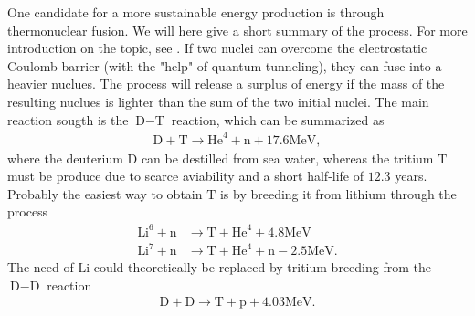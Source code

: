One candidate for a more sustainable energy production is through thermonuclear fusion.
We will here give a short summary of the process.
For more introduction on the topic, see \cite{Freidberg2008book}.
If two nuclei can overcome the electrostatic Coulomb-barrier (with the "help" of quantum tunneling), they can fuse into a heavier nuclues.
The process will release a surplus of energy if the mass of the resulting nuclues is lighter than the sum of the two initial nuclei.
The main reaction sougth is the $\text{D}-\text{T}$ reaction, which can be summarized as
%
\begin{align*}
    \text{D} + \text{T} \to \text{He}^4 + \text{n} + 17.6 \text{MeV},
\end{align*}
%
where the deuterium $\text{D}$ can be destilled from sea water, whereas the tritium $\text{T}$ must be produce due to scarce aviability and a short half-life of $12.3$ years.
Probably the easiest way to obtain $\text{T}$ is by breeding it from lithium through the process
%
\begin{align*}
    \text{Li}^6 + \text{n} &\to \text{T} + \text{He}^4 + 4.8 \text{MeV}\\
    \text{Li}^7 + \text{n} &\to \text{T} + \text{He}^4 + \text{n} - 2.5 \text{MeV}.
\end{align*}
%
The need of $\text{Li}$ could theoretically be replaced by tritium breeding from the $\text{D}-\text{D}$ reaction
%
\begin{align*}
    \text{D} + \text{D} \to \text{T} + \text{p} + 4.03 \text{MeV}.
\end{align*}
%

